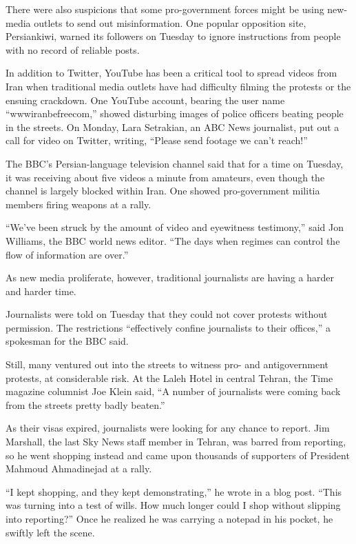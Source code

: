 ﻿\documentclass[12pt,a4paper,onecolumn]{article}
\begin{document}
There were also suspicions that some pro-government forces might be using new-media outlets to send
out misinformation. One popular opposition site, Persiankiwi, warned its followers on Tuesday to
ignore instructions from people with no record of reliable posts.

In addition to Twitter, YouTube has been a critical tool to spread videos from Iran when traditional
media outlets have had difficulty filming the protests or the ensuing crackdown. One YouTube
account, bearing the user name ``wwwiranbefreecom,'' showed disturbing images of police officers
beating people in the streets. On Monday, Lara Setrakian, an ABC News journalist, put out a call for
video on Twitter, writing, ``Please send footage we can't reach!''

The BBC's Persian-language television channel said that for a time on Tuesday, it was receiving
about five videos a minute from amateurs, even though the channel is largely blocked within Iran.
One showed pro-government militia members firing weapons at a rally.

``We've been struck by the amount of video and eyewitness testimony,'' said Jon Williams, the BBC
world news editor. ``The days when regimes can control the flow of information are over.''

As new media proliferate, however, traditional journalists are having a harder and harder time.

Journalists were told on Tuesday that they could not cover protests without permission. The
restrictions ``effectively confine journalists to their offices,'' a spokesman for the BBC said.

Still, many ventured out into the streets to witness pro- and antigovernment protests, at
considerable risk. At the Laleh Hotel in central Tehran, the Time magazine columnist Joe Klein said,
``A number of journalists were coming back from the streets pretty badly beaten.''

As their visas expired, journalists were looking for any chance to report. Jim Marshall, the last
Sky News staff member in Tehran, was barred from reporting, so he went shopping instead and came
upon thousands of supporters of President Mahmoud Ahmadinejad at a rally.

``I kept shopping, and they kept demonstrating,'' he wrote in a blog post. ``This was turning into a
test of wills. How much longer could I shop without slipping into reporting?'' Once he realized he
was carrying a notepad in his pocket, he swiftly left the scene.
\end{document}
